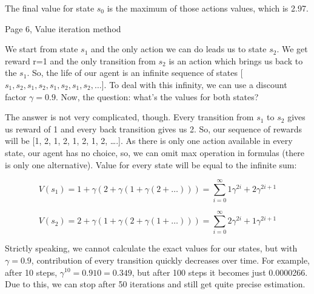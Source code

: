 The final value for state \begin{math}s_0\end{math} is the maximum of those actions values, which is 2.97.

Page 6, Value iteration method

We start from state \begin{math}s_1\end{math} and the only action we can do leads us to state \begin{math}s_2\end{math}. We
get reward r=1 and the only transition from \begin{math}s_2\end{math} is an action which brings us back
to the \begin{math}s_1\end{math}. So, the life of our agent is an infinite sequence of states [
\begin{math}s_1, s_2, s_1, s_2, s_1, s_2, s_1, s_2,\ldots\end{math}]. To deal with this infinity, we can use a discount
factor \begin{math}\gamma=0.9\end{math}. Now, the question: what’s the values for both states?

The answer is not very complicated, though. Every transition from \begin{math}s_1\end{math} to \begin{math}s_2\end{math} gives
us reward of 1 and every back transition gives us 2. So, our sequence of rewards
will be [1, 2, 1, 2, 1, 2, 1, 2, ….]. As there is only one action available in
every state, our agent has no choice, so, we can omit max operation in formulas
(there is only one alternative). Value for every state will be equal to the
infinite sum:


\begin{equation*}
V(s_1) = 1 + \gamma (2 + \gamma(1 + \gamma(2 + \ldots))) = \sum_{i=0}^\infty 1\gamma^{2i}+2\gamma^{2i+1}
\end{equation*}


\begin{equation*}
V(s_2) = 2 + \gamma (1 + \gamma(2 + \gamma(1 + \ldots))) = \sum_{i=0}^\infty 2\gamma^{2i}+1\gamma^{2i+1}
\end{equation*}

Strictly speaking, we cannot calculate the exact values for our states, but with
\begin{math}\gamma=0.9\end{math}, contribution of every transition quickly decreases over time. For
example, after 10 steps, \begin{math}\gamma^{10} = 0.910 = 0.349\end{math}, but after 100 steps it becomes just
0.0000266. Due to this, we can stop after 50 iterations and still get quite
precise estimation.



